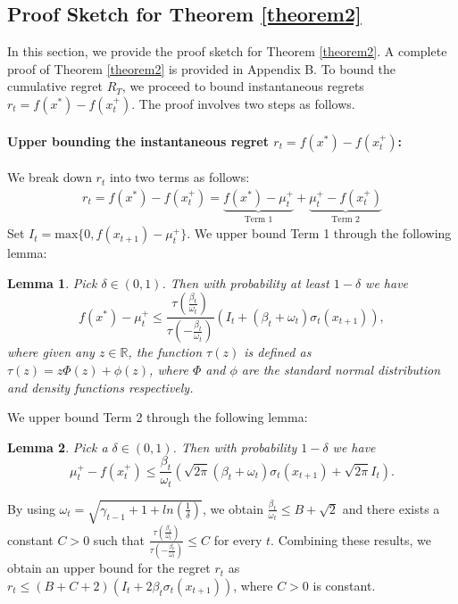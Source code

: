 \documentclass[twoside]{article}
\newtheorem{lemma}{Lemma}
\begin{document}
\subsection{Proof Sketch for Theorem \ref{theorem2}}
In this section, we provide the proof sketch for Theorem \ref{theorem2}. A complete proof of Theorem \ref{theorem2} is provided in Appendix B. To bound the cumulative regret $R_T$, we proceed to bound instantaneous regrets $r_t = f(x^*) - f(x_t^+)$. The proof involves two steps as follows.
\paragraph{Upper bounding the instantaneous regret $r_t = f(x^*) - f(x_t^+)$:} We break down $r_t$ into two terms as follows:
\begin{eqnarray*}
r_t  =  f(x^*) - f(x_t^+)  =   \underbrace{f(x^*) - \mu^+_{t}}_{\text{Term 1}} + \underbrace{\mu_{t}^+ - f(x_t^+)}_{\text{Term 2}}
\end{eqnarray*}
Set $I_t = \text{max}\{0, f(x_{t+1}) - \mu_t^+\}$. We upper bound Term 1 through the following lemma:
\begin{lemma}
Pick $\delta \in (0,1)$. Then with probability at least $1 -\delta$ we have
$$ f(x^*) - \mu_{t}^+ \le  \frac{\tau(\frac{\beta_t}{\omega_t})}{ \tau(-\frac{\beta_t}{\omega_t})}( I_t + (\beta_t + \omega_t)\sigma_{t}(x_{t+1})),$$
where given any $z \in \mathbb{R}$, the function $\tau(z)$ is defined as $\tau(z) = z\Phi(z) + \phi(z)$, where $\Phi$ and $\phi$ are the standard normal distribution and density functions respectively.
\end{lemma}
We upper bound Term 2 through the following lemma:
\begin{lemma}
Pick a $\delta \in (0,1)$. Then with probability $1 - \delta$ we have $$\mu_t^+ - f(x^+_t) \le \frac{\beta_t}{\omega_t} (\sqrt{2\pi}(\beta_t + \omega_t)\sigma_{t}(x_{t+1}) + \sqrt{2\pi} I_t).$$
\end{lemma}

By using $\omega_t = \sqrt{\gamma_{t-1} + 1 + ln(\frac{1}{\delta})}$, we obtain $\frac{\beta_t}{\omega_t} \le B + \sqrt{2}$ and there exists a constant $C > 0$ such that $\frac{\tau(\frac{\beta_t}{\omega_t})}{ \tau(-\frac{\beta_t}{\omega_t})} \le C$  for every $t$. Combining these results,  we obtain an upper bound for the regret $r_t$ as $r_t \le (B + C + 2)( I_t + 2\beta_t \sigma_{t}(x_{t+1}))$, where $C > 0$ is constant.
\end{document}
